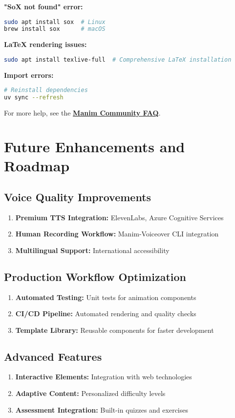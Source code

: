\documentclass[12pt,a4paper]{article}
\begin{document}
\textbf{"SoX not found" error:}
\begin{lstlisting}[language=bash]
sudo apt install sox  # Linux
brew install sox      # macOS
\end{lstlisting}

\textbf{LaTeX rendering issues:}
\begin{lstlisting}[language=bash]
sudo apt install texlive-full  # Comprehensive LaTeX installation
\end{lstlisting}

\textbf{Import errors:}
\begin{lstlisting}[language=bash]
# Reinstall dependencies
uv sync --refresh
\end{lstlisting}

For more help, see the \href{https://docs.manim.community/en/stable/faq/index.html}{\textbf{Manim Community FAQ}}.

\section{Future Enhancements and Roadmap}

\subsection{Voice Quality Improvements}
\begin{enumerate}
    \item \textbf{Premium TTS Integration:} ElevenLabs, Azure Cognitive Services
    \item \textbf{Human Recording Workflow:} Manim-Voiceover CLI integration
    \item \textbf{Multilingual Support:} International accessibility
\end{enumerate}

\subsection{Production Workflow Optimization}
\begin{enumerate}
    \item \textbf{Automated Testing:} Unit tests for animation components
    \item \textbf{CI/CD Pipeline:} Automated rendering and quality checks
    \item \textbf{Template Library:} Reusable components for faster development
\end{enumerate}

\subsection{Advanced Features}
\begin{enumerate}
    \item \textbf{Interactive Elements:} Integration with web technologies
    \item \textbf{Adaptive Content:} Personalized difficulty levels
    \item \textbf{Assessment Integration:} Built-in quizzes and exercises
\end{enumerate}
\end{document}

